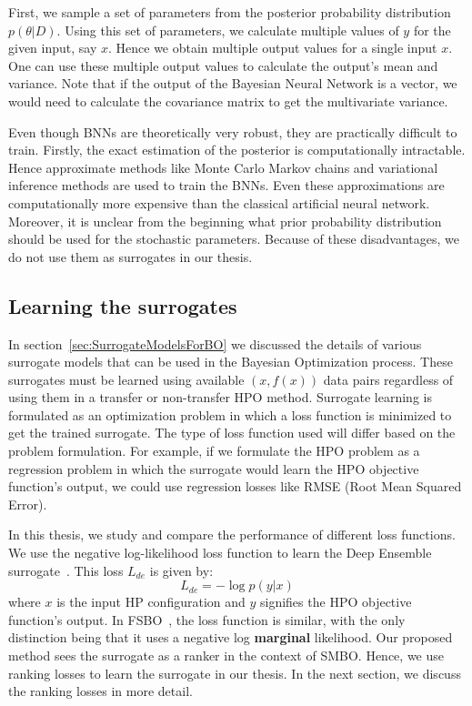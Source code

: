 \documentclass[12pt, twoside, ngerman]{report}
\begin{document}
First, we sample a set of parameters from the posterior probability distribution $p(\theta | D)$.
Using this set of parameters, we calculate multiple values of $y$ for the given input, say $x$.
Hence we obtain multiple output values for a single input $x$.
One can use these multiple output values to calculate the output's mean and variance.
Note that if the output of the Bayesian Neural Network is a vector, we would need to calculate the covariance matrix to get the multivariate variance.

Even though BNNs are theoretically very robust, they are practically difficult to train.
Firstly,  the exact estimation of the posterior is computationally intractable.
Hence approximate methods like Monte Carlo Markov chains and variational inference methods are used to train the BNNs.
Even these approximations are computationally more expensive than the classical artificial neural network.
Moreover,  it is unclear from the beginning what prior probability distribution should be used for the stochastic parameters.
Because of these disadvantages, we do not use them as surrogates in our thesis.

\subsection{Learning the surrogates}
In section~\ref{sec:SurrogateModelsForBO} we discussed the details of various surrogate models that can be used in the Bayesian Optimization process. These surrogates must be learned using available $(x, f(x))$  data pairs regardless of using them in a transfer or non-transfer HPO method. Surrogate learning is formulated as an optimization problem in which a loss function is minimized to get the trained surrogate.
The type of loss function used will differ based on the problem formulation. For example, if we formulate the HPO problem as a regression problem in which the surrogate would learn the HPO objective function's output, we could use regression losses like RMSE (Root Mean Squared Error).

In this thesis, we study and compare the performance of different loss functions. We use the negative log-likelihood loss function to learn the Deep Ensemble surrogate~\cite{DeepEnsemblePaper}. This loss $L_{de}$ is given by:
\begin{equation}
L_{de} = -\log p(y|x)
\end{equation}
where $x$ is the input HP configuration and $y$ signifies the HPO objective function's output.
In FSBO~\cite{fsbopaper}, the loss function is similar, with the only distinction being that it uses a negative log \textbf{marginal} likelihood.
Our proposed method sees the surrogate as a ranker in the context of SMBO. Hence, we use ranking losses to learn the surrogate in our thesis. In the next section, we discuss the ranking losses in more detail.
\end{document}
